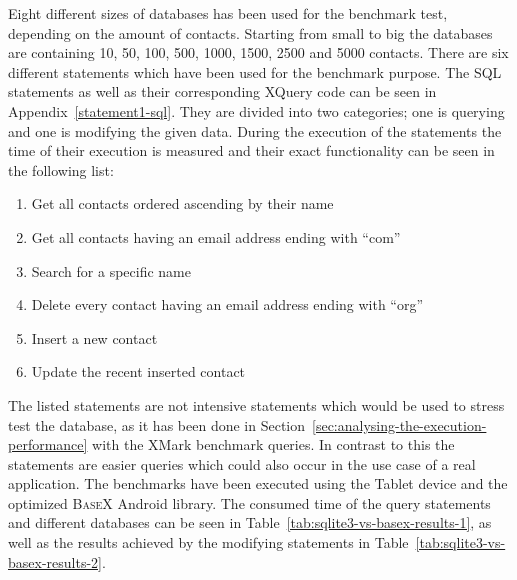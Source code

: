 Eight different sizes of databases has been used for the benchmark test, depending on the amount of contacts.
Starting from small to big the databases are containing 10, 50, 100, 500, 1000, 1500, 2500 and 5000 contacts.
There are six different statements which have been used for the benchmark purpose.
The SQL statements as well as their corresponding XQuery code can be seen in Appendix~\ref{statement1-sql}.
They are divided into  two categories; one is querying and one is modifying the given data.
During the execution of the statements the time of their execution is measured and their exact functionality can be seen in the following list:
\newpage
\begin{enumerate}
	\item Get all contacts ordered ascending by their name
	\item Get all contacts having an email address ending with ``com''
	\item Search for a specific name
	\item Delete every contact having an email address ending with ``org''
	\item Insert a new contact
	\item Update the recent inserted contact
\end{enumerate}
The listed statements are not intensive statements which would be used to stress test the database, as it has been done in Section~\ref{sec:analysing-the-execution-performance} with the XMark benchmark queries.
In contrast to this the statements are easier queries which could also occur in the use case of a real application.
The benchmarks have been executed using the Tablet device and the optimized \textsc{BaseX} Android library.
The consumed time of the query statements and different databases can be seen in Table~\ref{tab:sqlite3-vs-basex-results-1}, as well as the results achieved by the modifying statements in Table~\ref{tab:sqlite3-vs-basex-results-2}.


